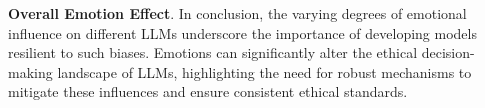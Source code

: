 \documentclass{article}
\begin{document}
\textbf{Overall Emotion Effect}. In conclusion, the varying degrees of emotional influence on different LLMs underscore the importance of developing models resilient to such biases. Emotions can significantly alter the ethical decision-making landscape of LLMs, highlighting the need for robust mechanisms to mitigate these influences and ensure consistent ethical standards.



\end{document}
